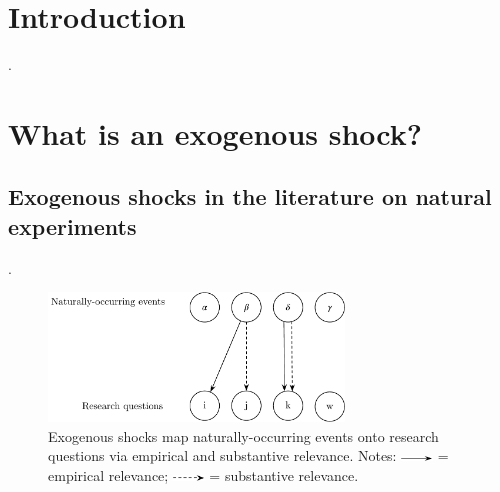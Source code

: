 \clearpage

\begin{refsection}

\section{Introduction}
\label{sec:introduction}

%
.

\section{What is an exogenous shock?}
\label{sec:what_exogenous_shocks}

\subsection{Exogenous shocks in the literature on natural experiments}
\label{subsec:exogenous_shocks_and_ne}

.


\begin{figure}[!htbp]
  \centering
  \includegraphics[width=0.7\textwidth]{exhibits/event_rq_mapping.pdf}
  \caption{Exogenous shocks map naturally-occurring events onto 
  research questions via empirical and substantive relevance. Notes:
  \includegraphics[width=0.075\textwidth]{exhibits/event_rq_mapping_0.pdf}
  = empirical relevance; 
  \includegraphics[width=0.075\textwidth]{exhibits/event_rq_mapping_1.pdf}
   = substantive relevance.}
  \label{fig:event_rq_mapping}
\end{figure}




\end{refsection}
